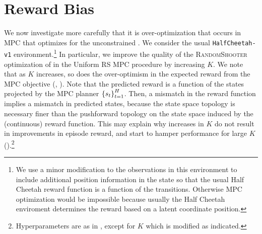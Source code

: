 \documentclass{article}
\let\Oldsection\section
\renewcommand{\section}{\FloatBarrier\Oldsection}
\begin{document}

\section{Reward Bias}

We now investigate more carefully that it is over-optimization that occurs in MPC that optimizes for the unconstrained . We consider the usual \texttt{HalfCheetah-v1} environment.\footnote{We use a minor modification to the observations in this environment to include additional position information in the state so that the usual Half Cheetah reward function is a function of the transitions. Otherwise MPC optimization would be impossible because usually the Half Cheetah enviroment determines the reward based on a latent coordinate position.} In particular, we improve the quality of the \textsc{RandomShooter} optimization of  in the Uniform RS MPC procedure by increasing $K$. We note that as $K$ increases, so does the over-optimism in the expected reward from the MPC objective (, ). Note that the predicted reward is a function of the states projected by the MPC planner $\left\{{s_t}\right\}_{t=1}^H$. Then, a mismatch in the reward function implies a mismatch in predicted states, because the state space topology is necessary finer than the pushforward topology on the state space induced by the (continuous) reward function. This may explain why increases in $K$ do not result in improvements in episode reward, and start to hamper performance for large $K$ ().\footnote{Hyperparameters are as in , except for $K$ which is modified as indicated.}

\end{document}
